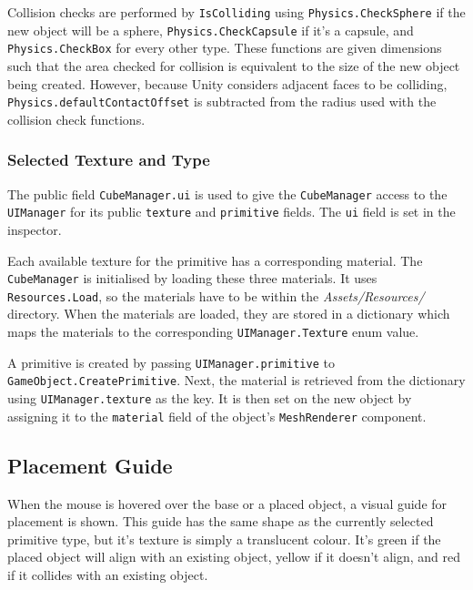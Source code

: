 \documentclass[a4paper, 12pt]{scrartcl}
\begin{document}
Collision checks are performed by \texttt{IsColliding} using \texttt{Physics.CheckSphere} if the new object will be a sphere, \texttt{Physics.CheckCapsule} if it's a capsule, and \texttt{Physics.CheckBox} for every other type. These functions are given dimensions such that the area checked for collision is equivalent to the size of the new object being created. However, because Unity considers adjacent faces to be colliding, \texttt{Physics.defaultContactOffset} is subtracted from the radius used with the collision check functions.

\subsubsection{Selected Texture and Type}
The public field \texttt{CubeManager.ui} is used to give the \texttt{CubeManager} access to the \texttt{UIManager} for its public \texttt{texture} and \texttt{primitive} fields. The \texttt{ui} field is set in the inspector.

Each available texture for the primitive has a corresponding material. The \texttt{CubeManager} is initialised by loading these three materials. It uses \texttt{Resources.Load}, so the materials have to be within the \textit{Assets/Resources/} directory. When the materials are loaded, they are stored in a dictionary which maps the materials to the corresponding \texttt{UIManager.Texture} enum value.

A primitive is created by passing \texttt{UIManager.primitive} to \texttt{GameObject.Create\-Primitive}. Next, the material is retrieved from the dictionary using \texttt{UIManager.texture} as the key. It is then set on the new object by assigning it to the \texttt{material} field of the object's \texttt{MeshRenderer} component.

\subsection{Placement Guide}
When the mouse is hovered over the base or a placed object, a visual guide for placement is shown. This guide has the same shape as the currently selected primitive type, but it's texture is simply a translucent colour. It's green if the placed object will align with an existing object, yellow if it doesn't align, and red if it collides with an existing object.
\end{document}
